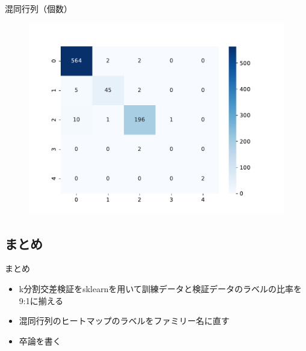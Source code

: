 \documentclass{beamer}
\begin{document}
  \begin{frame}{混同行列（個数）}
    \begin{figure}
      \centering
      \includegraphics[keepaspectratio, scale=0.6]{images/deep_conv_cnt_heatmap.pdf}
      \label{fig:heatmap}
    \end{figure}
  \end{frame}

  \begin{frame}
    \section{まとめ}
  \end{frame}

  \begin{frame}{まとめ}
    \begin{itemize}
      \item k分割交差検証をsklearnを用いて訓練データと検証データのラベルの比率を9:1に揃える
      \item 混同行列のヒートマップのラベルをファミリー名に直す
      \item 卒論を書く
    \end{itemize}
  \end{frame}
\end{document}
